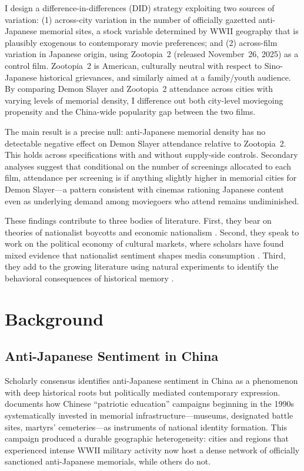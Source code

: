 \documentclass[12pt]{article}
\begin{document}
I design a difference-in-differences (DID) strategy exploiting two sources of variation: (1) across-city variation in the number of officially gazetted anti-Japanese memorial sites, a stock variable determined by WWII geography that is plausibly exogenous to contemporary movie preferences; and (2) across-film variation in Japanese origin, using Zootopia~2 (released November~26, 2025) as a control film. Zootopia~2 is American, culturally neutral with respect to Sino-Japanese historical grievances, and similarly aimed at a family/youth audience. By comparing Demon Slayer and Zootopia~2 attendance across cities with varying levels of memorial density, I difference out both city-level moviegoing propensity and the China-wide popularity gap between the two films.

The main result is a precise null: anti-Japanese memorial density has no detectable negative effect on Demon Slayer attendance relative to Zootopia~2. This holds across specifications with and without supply-side controls. Secondary analyses suggest that conditional on the number of screenings allocated to each film, attendance per screening is if anything slightly higher in memorial cities for Demon Slayer---a pattern consistent with cinemas rationing Japanese content even as underlying demand among moviegoers who attend remains undiminished.

These findings contribute to three bodies of literature. First, they bear on theories of nationalist boycotts and economic nationalism \citep{pandya2016,garcia2020}. Second, they speak to work on the political economy of cultural markets, where scholars have found mixed evidence that nationalist sentiment shapes media consumption \citep{jaroslaw2018,bai2021}. Third, they add to the growing literature using natural experiments to identify the behavioral consequences of historical memory \citep{lowes2021,nunn2011}.

\section{Background}

\subsection{Anti-Japanese Sentiment in China}

Scholarly consensus identifies anti-Japanese sentiment in China as a phenomenon with deep historical roots but politically mediated contemporary expression. \citet{wang2012} documents how Chinese ``patriotic education'' campaigns beginning in the 1990s systematically invested in memorial infrastructure---museums, designated battle sites, martyrs' cemeteries---as instruments of national identity formation. This campaign produced a durable geographic heterogeneity: cities and regions that experienced intense WWII military activity now host a dense network of officially sanctioned anti-Japanese memorials, while others do not.
\end{document}
